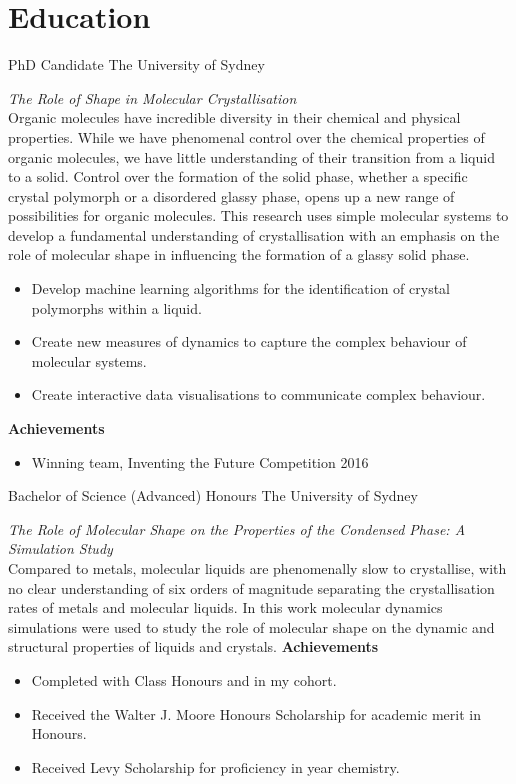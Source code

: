 



\makecvtitle{}

\vspace{-4em}
\section{Education}

{PhD Candidate}
{The University of Sydney}{}{}
{%
  \emph{The Role of Shape in Molecular Crystallisation}\\
  Organic molecules have incredible diversity in their chemical and physical properties. While we
  have phenomenal control over the chemical properties of organic molecules, we have little
  understanding of their transition from a liquid to a solid. Control over the formation of the
  solid phase, whether a specific crystal polymorph or a disordered glassy phase, opens up a new
  range of possibilities for organic molecules.
  This research uses simple molecular systems to develop a fundamental understanding of
  crystallisation with an emphasis on the role of molecular shape in influencing the formation of
  a glassy solid phase.
  \begin{itemize}
    \item Develop machine learning algorithms for the identification of crystal polymorphs within a
      liquid.
    \item Create new measures of dynamics to capture the complex behaviour of molecular systems.
    \item Create interactive data visualisations to communicate complex behaviour.
  \end{itemize}
  \textbf{Achievements}
  \begin{itemize}
    \item Winning team, Inventing the Future Competition 2016
  \end{itemize}
}
\vspace{1em}


{Bachelor of Science (Advanced) Honours}
{The University of Sydney}{}{}
{%
  \emph{The Role of Molecular Shape on the Properties of the Condensed Phase: A Simulation Study}\\
  Compared to metals, molecular liquids are phenomenally slow to crystallise, with no clear
  understanding of six orders of magnitude separating the crystallisation rates of metals and
  molecular liquids.
  In this work molecular dynamics simulations were used to study the role of molecular shape on the
  dynamic and structural properties of liquids and crystals.
  \textbf{Achievements}
  \begin{itemize}
    \item Completed with  Class Honours and  in my cohort.
    \item Received the Walter J. Moore Honours Scholarship for academic merit in Honours.
    \item Received Levy Scholarship for proficiency in  year chemistry.
  \end{itemize}
}
\vspace{1em}

